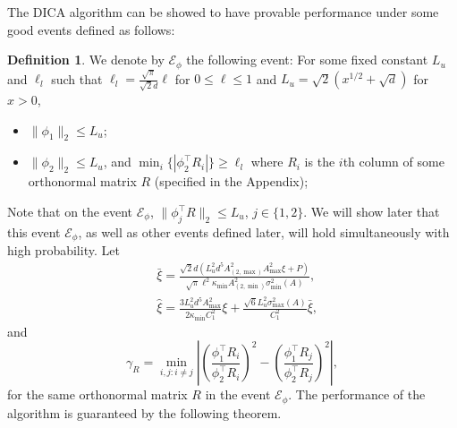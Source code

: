 \documentclass[twoside]{article}
\newcommand{\Ephione}{\mathcal{E}_{\phi_1}}
\newcommand{\Ephitwo}{\mathcal{E}_{\phi_2}}
\newcommand{\Ephi}{\mathcal{E}_{\phi}}
\theoremstyle{definition}
\newtheorem{definition}[lemma]{Definition}
\begin{document}
The DICA algorithm can be showed to have provable performance under some good events defined as follows:
\begin{definition}
We denote by $\Ephi$ the following event:
For some fixed constant $L_u$ and $\ell_l$ such that $\ell_l = \frac{\sqrt{\pi}}{\sqrt{2}d}\ell$ for $0\le \ell\le 1$ and $ L_u = \sqrt{2}\left(x^{1/2}+\sqrt{d}\right)$ for $x>0$,
\begin{itemize}
\vspace{-3mm}
\item $\|\phi_1\|_2 \le L_u$;
\item $\|\phi_2\|_2 \le L_u$, and $\min_i \{|\phi_2^{\top}R_i|\} \ge \ell_l$ where $R_i$ is the $i$th column of some orthonormal matrix $R$ (specified in the Appendix);
\end{itemize} 
\end{definition}  
Note that on the event $\Ephi$, $\|\phi_j^{\top}R\|_2\le L_u$, $j\in\{1,2\}$. 
We will show later that this event $\Ephi$, as well as other events defined later, will hold simultaneously with high probability.
Let 
\begin{align*}
& \bar{\xi} =   \frac{\sqrt{2}d\left(L_u^2d^5 A_{(2,\max)}^2A_{\max}^2\xi + P\right)}{\sqrt{\pi}\ell^2\kappa_{\min}A^2_{(2,\min)}\sigma_{\min}^2(A)}, \\
& \widehat{\xi} = \frac{3L_u^2d^5A^2_{\max}}{2\kappa_{\min}C_1^2}\xi + \frac{\sqrt{6}L_u^2\sigma_{\max}^2(A)}{C_1^2}\bar{\xi},
\end{align*} 
and 
\begin{equation}
\label{def:gammaR}
\gamma_R =  \min_{i,j: i\neq j} \left\vert \left(\frac{\phi_1^{\top}R_i}{\phi_2^{\top}R_i}\right)^2 - \left(\frac{\phi_1^{\top}R_j}{\phi_2^{\top}R_j}\right)^2 \right\vert, 
\end{equation}
for the same orthonormal matrix $R$ in the event $\Ephi$.
The performance of the algorithm is guaranteed by the following theorem.
\end{document}
